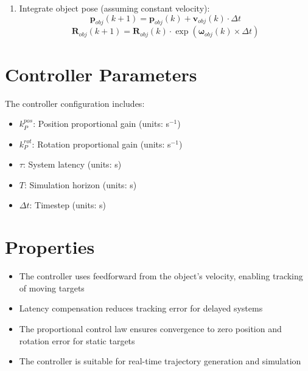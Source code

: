 \documentclass{article}
\begin{document}
\begin{enumerate}
\begin{enumerate}
        \item Integrate object pose (assuming constant velocity):
        \begin{equation}
            \bm{p}_{obj}(k+1) = \bm{p}_{obj}(k) + \bm{v}_{obj}(k) \cdot \Delta t
        \end{equation}
        \begin{equation}
            \bm{R}_{obj}(k+1) = \bm{R}_{obj}(k) \cdot \exp(\bm{\omega}_{obj}(k) \times \Delta t)
        \end{equation}
    \end{enumerate}
\end{enumerate}

\section{Controller Parameters}

The controller configuration includes:
\begin{itemize}
    \item $k_P^{pos}$: Position proportional gain (units: s$^{-1}$)
    \item $k_P^{rot}$: Rotation proportional gain (units: s$^{-1}$)
    \item $\tau$: System latency (units: s)
    \item $T$: Simulation horizon (units: s)
    \item $\Delta t$: Timestep (units: s)
\end{itemize}

\section{Properties}

\begin{itemize}
    \item The controller uses feedforward from the object's velocity, enabling tracking of moving targets
    \item Latency compensation reduces tracking error for delayed systems
    \item The proportional control law ensures convergence to zero position and rotation error for static targets
    \item The controller is suitable for real-time trajectory generation and simulation
\end{itemize}
\end{document}
